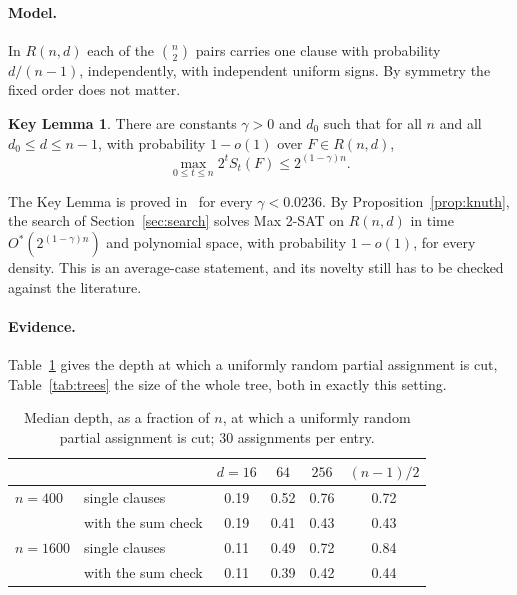 \documentclass[11pt,a4paper]{article}
\theoremstyle{definition}
\newtheorem{keylemma}[theorem]{Key Lemma}
\theoremstyle{remark}
\newcommand{\Ostar}{O^{*}}
\begin{document}
\paragraph{Model.} In $R(n,d)$ each of the $\binom n2$ pairs carries one clause
with probability $d/(n-1)$, independently, with independent uniform signs. By
symmetry the fixed order does not matter.

\begin{keylemma}\label{kl}
There are constants $\gamma>0$ and $d_0$ such that for all $n$ and all
$d_0\le d\le n-1$, with probability $1-o(1)$ over $F\in R(n,d)$,
\[
 \max_{0\le t\le n}2^tS_t(F)\le2^{(1-\gamma)n}.
\]
\end{keylemma}

The Key Lemma is proved in~\cite[Corollary~3]{N8} for every $\gamma<0.0236$.
By Proposition~\ref{prop:knuth}, the search of Section~\ref{sec:search}
solves Max 2-SAT on $R(n,d)$ in time $\Ostar(2^{(1-\gamma)n})$ and polynomial
space, with probability $1-o(1)$, for every density. This is an average-case
statement, and its novelty still has to be checked against the literature.

\paragraph{Evidence.} Table~\ref{tab:death} gives the depth at which a
uniformly random partial assignment is cut, Table~\ref{tab:trees} the size of
the whole tree, both in exactly this setting.

\begin{table}[ht]
\centering
\begin{tabular}{llcccc}
\toprule
 & & $d=16$ & $64$ & $256$ & $(n-1)/2$\\
\midrule
$n=400$ & single clauses & 0.19 & 0.52 & 0.76 & 0.72\\
 & with the sum check & 0.19 & 0.41 & 0.43 & 0.43\\
$n=1600$ & single clauses & 0.11 & 0.49 & 0.72 & 0.84\\
 & with the sum check & 0.11 & 0.39 & 0.42 & 0.44\\
\bottomrule
\end{tabular}
\caption{Median depth, as a fraction of $n$, at which a uniformly random
partial assignment is cut; $30$ assignments per entry.}\label{tab:death}
\end{table}
\end{document}
